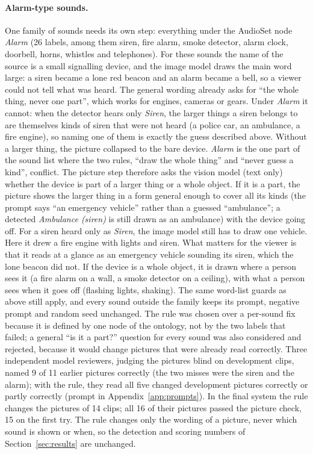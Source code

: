 \paragraph{Alarm-type sounds.} One family of sounds needs its own step: everything under the AudioSet node
\emph{Alarm} (26 labels, among them siren, fire alarm, smoke detector, alarm clock, doorbell, horns, whistles and
telephones). For these sounds the name of the source is a small signalling device, and the image model draws the main
word large: a siren became a lone red beacon and an alarm became a bell, so a viewer could not tell what was heard. The
general wording already asks for ``the whole thing, never one part'', which works for engines, cameras or gears.
Under \emph{Alarm} it cannot: when the detector hears only \emph{Siren}, the larger things a siren belongs to are
themselves kinds of siren that were not heard (a police car, an ambulance, a fire engine), so naming one of them is
exactly the guess described above. Without a larger thing, the picture collapsed to the bare device. \emph{Alarm} is the one
part of the sound list where the two rules, ``draw the whole thing'' and ``never guess a kind'', conflict. The picture step therefore asks the vision model (text only) whether the device is part of a larger thing or
a whole object. If it is a part, the picture shows the larger thing in a form general enough to cover all its kinds
(the prompt says ``an emergency vehicle'' rather than a guessed ``ambulance''; a detected \emph{Ambulance (siren)}
is still drawn as an ambulance) with the device going off. For a siren heard only as \emph{Siren}, the image model
still has to draw one vehicle. Here it drew a fire engine with lights and siren. What matters for the viewer is that it reads
at a glance as an emergency vehicle sounding its siren, which the lone beacon did not. If the device is a whole object, it is drawn
where a person sees it (a fire alarm on a wall, a smoke detector on a ceiling), with what a person sees when it goes
off (flashing lights, shaking). The same word-list guards as above still apply, and every sound outside the family keeps
its prompt, negative prompt and random seed unchanged. The rule was chosen over a per-sound fix because it is defined by
one node of the ontology, not by the two labels that failed; a general ``is it a part?'' question for every sound was
also considered and rejected, because it would change pictures that were already read correctly. Three independent model reviewers, judging the pictures
blind on development clips, named 9 of 11 earlier pictures correctly (the two misses were the siren and the alarm);
with the rule, they read all five changed development pictures correctly or partly correctly (prompt in
Appendix~\ref{app:prompts}). In the final system the rule changes the pictures of 14 clips; all 16 of their pictures
passed the picture check, 15 on the first try. The rule changes only the wording of a picture,
never which sound is shown or when, so the detection and scoring numbers of Section~\ref{sec:results} are unchanged.

